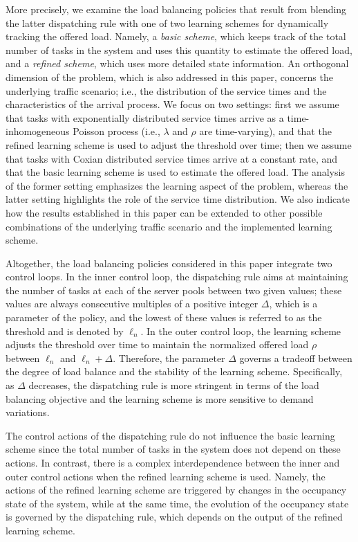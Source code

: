 \documentclass[a4paper, 12pt]{article}
\theoremstyle{definition}
\begin{document}
More precisely, we examine the load balancing policies that result from blending the latter dispatching rule with one of two learning schemes for dynamically tracking the offered load. Namely, a \emph{basic scheme}, which keeps track of the total number of tasks in the system and uses this quantity to estimate the offered load, and a \emph{refined scheme}, which uses more detailed state information. An orthogonal dimension of the problem, which is also addressed in this paper, concerns the underlying traffic scenario; i.e., the distribution of the service times and the characteristics of the arrival process. We focus on two settings: first we assume that tasks with exponentially distributed service times arrive as a time-inhomogeneous Poisson process (i.e., $\lambda$ and $\rho$ are time-varying), and that the refined learning scheme is used to adjust the threshold over time; then we assume that tasks with Coxian distributed service times arrive at a constant rate, and that the basic learning scheme is used to estimate the offered load. The analysis of the former setting emphasizes the learning aspect of the problem, whereas the latter setting highlights the role of the service time distribution. We also indicate how the results established in this paper can be extended to other possible combinations of the underlying traffic scenario and the implemented learning scheme.

Altogether, the load balancing policies considered in this paper integrate two control loops. In the inner control loop, the dispatching rule aims at maintaining the number of tasks at each of the server pools between two given values; these values are always consecutive multiples of a positive integer $\Delta$, which is a parameter of the policy, and the lowest of these values is referred to as the threshold and is denoted by $\ell_n$. In the outer control loop, the learning scheme adjusts the threshold over time to maintain the normalized offered load $\rho$ between $\ell_n$ and $\ell_n + \Delta$. Therefore, the parameter $\Delta$ governs a tradeoff between the degree of load balance and the stability of the learning scheme. Specifically, as $\Delta$ decreases, the dispatching rule is more stringent in terms of the load balancing objective and the learning scheme is more sensitive to demand variations.

The control actions of the dispatching rule do not influence the basic learning scheme since the total number of tasks in the system does not depend on these actions. In contrast, there is a complex interdependence between the inner and outer control actions when the refined learning scheme is used. Namely, the actions of the refined learning scheme are triggered by changes in the occupancy state of the system, while at the same time, the evolution of the occupancy state is governed by the dispatching rule, which depends on the output of the refined learning scheme.
\end{document}
